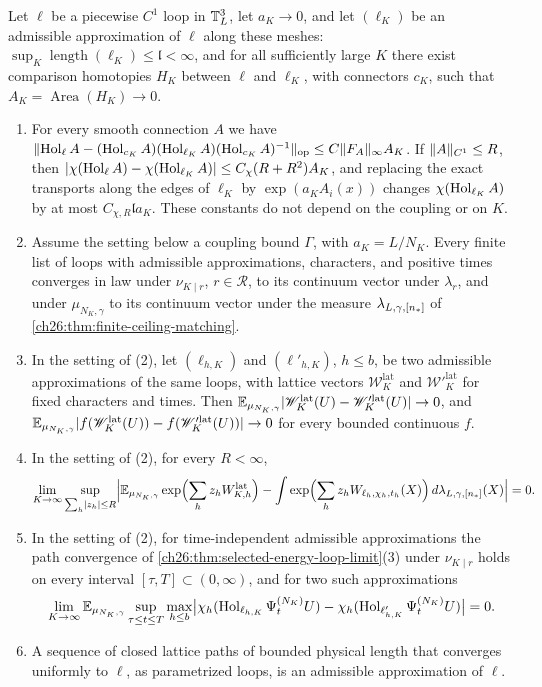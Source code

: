 \begin{theorem}\label{ch26:thm:matched-paths}
Let $\ell$ be a piecewise $C^1$ loop in $\mathbb T_L^3$, let $a_K\to0$, and let $(\ell_K)$ be an admissible approximation of $\ell$ along these meshes: $\sup_K\operatorname{length}(\ell_K)\le\mathfrak l<\infty$, and for all sufficiently large $K$ there exist comparison homotopies $H_K$ between $\ell$ and $\ell_K$, with connectors $c_K$, such that $A_K=\operatorname{Area}(H_K)\to0$.
\begin{enumerate}
\item For every smooth connection $A$ we have $\lVert \operatorname{Hol}_\ell A-(\operatorname{Hol}_{c_K}A)(\operatorname{Hol}_{\ell_K}A)(\operatorname{Hol}_{c_K}A)^{-1}\rVert_{\mathrm{op}}\le C\lVert F_A\rVert_\infty A_K$. If $\lVert A\rVert_{C^1}\le R$, then $\lvert \chi(\operatorname{Hol}_\ell A)-\chi(\operatorname{Hol}_{\ell_K}A)\rvert\le C_\chi(R+R^2)A_K$, and replacing the exact transports along the edges of $\ell_K$ by $\exp(a_KA_i(x))$ changes $\chi(\operatorname{Hol}_{\ell_K}A)$ by at most $C_{\chi,R}\mathfrak la_K$. These constants do not depend on the coupling or on $K$.
\item Assume the setting below a coupling bound $\Gamma$, with $a_K=L/N_K$. Every finite list of loops with admissible approximations, characters, and positive times converges in law under $\nu_{K\mid r}$, $r\in\mathcal R$, to its continuum vector under $\lambda_r$, and under $\mu_{N_K,\gamma}$ to its continuum vector under the measure $\lambda_{L,\gamma,[n_*]}$ of \cref{ch26:thm:finite-ceiling-matching}.
\item In the setting of (2), let $(\ell_{h,K})$ and $(\ell'_{h,K})$, $h\le b$, be two admissible approximations of the same loops, with lattice vectors $\mathscr W^{\mathrm{lat}}_K$ and $\mathscr W'^{\mathrm{lat}}_K$ for fixed characters and times. Then $\mathbb E_{\mu_{N_K,\gamma}}\lvert \mathscr W^{\mathrm{lat}}_K(U)-\mathscr W'^{\mathrm{lat}}_K(U)\rvert\to0$, and $\mathbb E_{\mu_{N_K,\gamma}}\lvert f(\mathscr W^{\mathrm{lat}}_K(U))-f(\mathscr W'^{\mathrm{lat}}_K(U))\rvert\to0$ for every bounded continuous $f$.
\item In the setting of (2), for every $R<\infty$,
\[
 \lim_{K\to\infty}\sup_{\sum_h\lvert z_h\rvert\le R}\Bigl\lvert\mathbb E_{\mu_{N_K,\gamma}}\exp\Bigl(\sum_hz_hW^{\mathrm{lat}}_{K,h}\Bigr)-\int\exp\Bigl(\sum_hz_hW_{\ell_h,\chi_h,t_h}(X)\Bigr)\,d\lambda_{L,\gamma,[n_*]}(X)\Bigr\rvert=0 .
\]
\item In the setting of (2), for time-independent admissible approximations the path convergence of \cref{ch26:thm:selected-energy-loop-limit}(3) under $\nu_{K\mid r}$ holds on every interval $[\tau,T]\subset(0,\infty)$, and for two such approximations
\[
 \lim_{K\to\infty}\mathbb E_{\mu_{N_K,\gamma}}\sup_{\tau\le t\le T}\max_{h\le b}\bigl\lvert\chi_h(\operatorname{Hol}_{\ell_{h,K}}\Psi^{(N_K)}_tU)-\chi_h(\operatorname{Hol}_{\ell'_{h,K}}\Psi^{(N_K)}_tU)\bigr\rvert=0 .
\]
\item A sequence of closed lattice paths of bounded physical length that converges uniformly to $\ell$, as parametrized loops, is an admissible approximation of $\ell$.
\end{enumerate}
\end{theorem}

